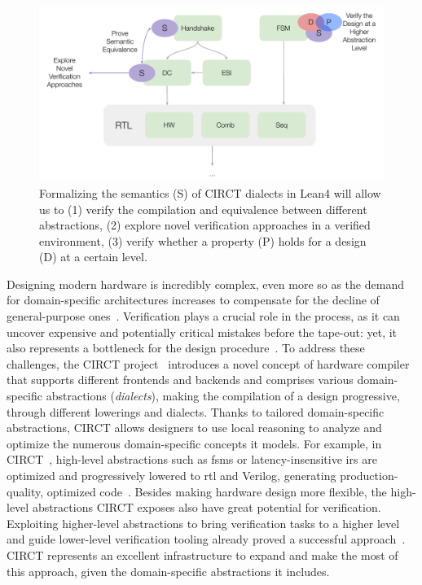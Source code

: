 \documentclass[sigconf,authorversion,nonacm, 11pt]{acmart}
\begin{document}
\begin{figure}[ht]
    \includegraphics[scale=0.8]{semantics.pdf}
    \caption{Formalizing the semantics (S) of CIRCT dialects in Lean4 will allow us to (1) verify the compilation and equivalence 
    between different abstractions, (2) explore novel verification approaches in a verified environment, (3) verify whether a property
    (P) holds for a design (D) at a certain level.}
\end{figure}

Designing modern hardware is incredibly complex, even more so as the demand for domain-specific architectures increases to compensate for the decline of general-purpose ones~\cite{asanovic2006landscape, hennessy2018new}. 
Verification plays a crucial role in the process, as it can uncover expensive and potentially critical mistakes before the tape-out: yet, it also represents a bottleneck for the design procedure~\cite{foster2013design, wilson2020verifstudy, vasudevan2021learning}. 
To address these challenges, the CIRCT project~\cite{circt, mlir_circt} introduces a novel concept of hardware compiler that supports different frontends and backends and comprises various domain-specific abstractions (\textit{dialects}), making the compilation of a design progressive, through different lowerings and dialects. 
Thanks to tailored domain-specific abstractions, CIRCT allows designers to use local reasoning to analyze and optimize the numerous domain-specific concepts it models.
For example, in CIRCT~\cite{circt, mlir_circt}, high-level abstractions such as \acp{fsm} or latency-insensitive \acp{ir} are optimized and progressively lowered to \ac{rtl} and Verilog, generating production-quality, optimized code~\cite{circt_sifive}. 
Besides making hardware design more flexible, the high-level abstractions CIRCT exposes also have great potential for verification.
Exploiting higher-level abstractions to bring verification tasks to a higher level and guide lower-level verification tooling already proved a successful approach~\cite{huang2018instruction, chen2021leveraging, mattarei2018cosa, hunt2006sat}.
CIRCT represents an excellent infrastructure to expand and make the most of this approach, given the domain-specific abstractions it includes.
\end{document}
